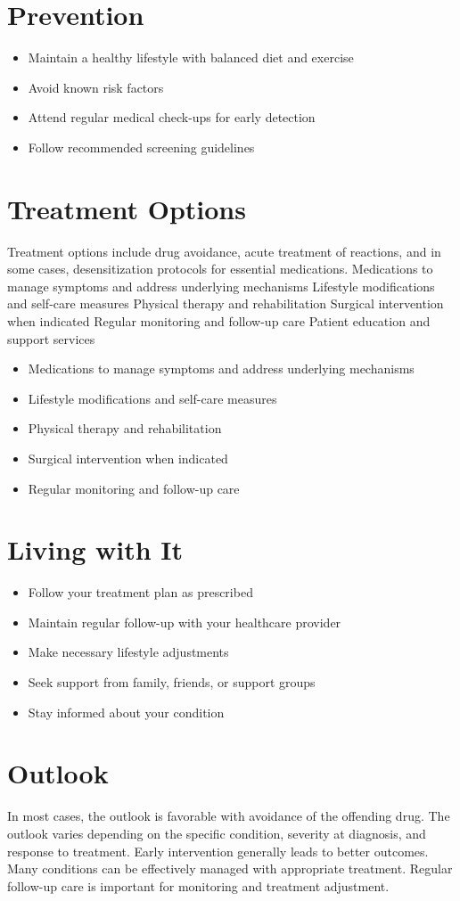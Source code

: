 \section{Prevention}
\begin{itemize}[noitemsep]
  \item Maintain a healthy lifestyle with balanced diet and exercise
  \item Avoid known risk factors
  \item Attend regular medical check-ups for early detection
  \item Follow recommended screening guidelines
\end{itemize}
\section{Treatment Options}
Treatment options include drug avoidance, acute treatment of reactions, and in some cases, desensitization protocols for essential medications. Medications to manage symptoms and address underlying mechanisms Lifestyle modifications and self-care measures Physical therapy and rehabilitation Surgical intervention when indicated Regular monitoring and follow-up care Patient education and support services

\begin{itemize}[noitemsep]
  \item Medications to manage symptoms and address underlying mechanisms
  \item Lifestyle modifications and self-care measures
  \item Physical therapy and rehabilitation
  \item Surgical intervention when indicated
  \item Regular monitoring and follow-up care
\end{itemize}
\section{Living with It}
\begin{itemize}[noitemsep]
  \item Follow your treatment plan as prescribed
  \item Maintain regular follow-up with your healthcare provider
  \item Make necessary lifestyle adjustments
  \item Seek support from family, friends, or support groups
  \item Stay informed about your condition
\end{itemize}
\section{Outlook}
In most cases, the outlook is favorable with avoidance of the offending drug. The outlook varies depending on the specific condition, severity at diagnosis, and response to treatment. Early intervention generally leads to better outcomes. Many conditions can be effectively managed with appropriate treatment. Regular follow-up care is important for monitoring and treatment adjustment.
